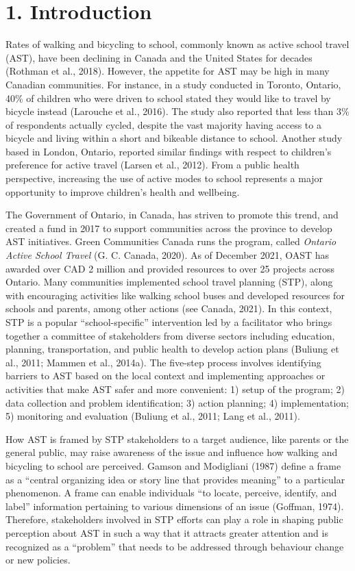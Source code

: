 \documentclass[]{elsarticle} %
\begin{document}
\newpage

\hypertarget{introduction}{%
\section{1. Introduction}\label{introduction}}

Rates of walking and bicycling to school, commonly known as active
school travel (AST), have been declining in Canada and the United States
for decades (Rothman et al., 2018). However, the appetite for AST may be
high in many Canadian communities. For instance, in a study conducted in
Toronto, Ontario, 40\% of children who were driven to school stated they
would like to travel by bicycle instead (Larouche et al., 2016). The
study also reported that less than 3\% of respondents actually cycled,
despite the vast majority having access to a bicycle and living within a
short and bikeable distance to school. Another study based in London,
Ontario, reported similar findings with respect to children's preference
for active travel (Larsen et al., 2012). From a public health
perspective, increasing the use of active modes to school represents a
major opportunity to improve children's health and wellbeing.

The Government of Ontario, in Canada, has striven to promote this trend,
and created a fund in 2017 to support communities across the province to
develop AST initiatives. Green Communities Canada runs the program,
called \emph{Ontario Active School Travel} (G. C. Canada, 2020). As of
December 2021, OAST has awarded over CAD 2 million and provided
resources to over 25 projects across Ontario. Many communities
implemented school travel planning (STP), along with encouraging
activities like walking school buses and developed resources for schools
and parents, among other actions (see Canada, 2021). In this context,
STP is a popular ``school-specific'' intervention led by a facilitator
who brings together a committee of stakeholders from diverse sectors
including education, planning, transportation, and public health to
develop action plans (Buliung et al., 2011; Mammen et al., 2014a). The
five-step process involves identifying barriers to AST based on the
local context and implementing approaches or activities that make AST
safer and more convenient: 1) setup of the program; 2) data collection
and problem identification; 3) action planning; 4) implementation; 5)
monitoring and evaluation (Buliung et al., 2011; Lang et al., 2011).

How AST is framed by STP stakeholders to a target audience, like parents
or the general public, may raise awareness of the issue and influence
how walking and bicycling to school are perceived. Gamson and Modigliani
(1987) define a frame as a ``central organizing idea or story line that
provides meaning'' to a particular phenomenon. A frame can enable
individuals ``to locate, perceive, identify, and label'' information
pertaining to various dimensions of an issue (Goffman, 1974). Therefore,
stakeholders involved in STP efforts can play a role in shaping public
perception about AST in such a way that it attracts greater attention
and is recognized as a ``problem'' that needs to be addressed through
behaviour change or new policies.
\end{document}

